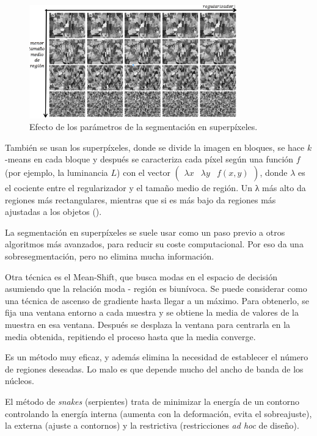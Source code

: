 \documentclass[nochap,palatino]{apuntes}
\begin{document}
\begin{figure}[hbtp]
\centering
\includegraphics[width=0.8\textwidth]{img/Superpixels.png}
\caption{Efecto de los parámetros de la segmentación en superpíxeles.}
\label{fig:Superpixeles}
\end{figure}

También se usan los superpíxeles, donde se divide la imagen en bloques, se hace $k$-means en cada bloque y después se caracteriza cada píxel según una función $f$ (por ejemplo, la luminancia $L$) con el vector $\begin{pmatrix}λx & λy & f(x,y)\end{pmatrix}$, donde $λ$ es el cociente entre el regularizador y el tamaño medio de región. Un λ más alto da regiones más rectangulares, mientras que si es más bajo da regiones más ajustadas a los objetos ().

La segmentación en superpíxeles se suele usar como un paso previo a otros algoritmos más avanzados, para reducir su coste computacional. Por eso da una sobresegmentación, pero no elimina mucha información.

Otra técnica es el Mean-Shift, que busca modas en el espacio de decisión asumiendo que la relación moda - región es biunívoca. Se puede considerar como una técnica de ascenso de gradiente hasta llegar a un máximo. Para obtenerlo, se fija una ventana entorno a cada muestra y se obtiene la media de valores de la muestra en esa ventana. Después se desplaza la ventana para centrarla en la media obtenida, repitiendo el proceso hasta que la media converge.

Es un método muy eficaz, y además elimina la necesidad de establecer el número de regiones deseadas. Lo malo es que depende mucho del ancho de banda de los núcleos.

El método de \textit{snakes} (serpientes) trata de minimizar la energía de un contorno controlando la energía interna (aumenta con la deformación, evita el sobreajuste), la externa (ajuste a contornos) y la restrictiva (restricciones \textit{ad hoc} de diseño).
\end{document}
